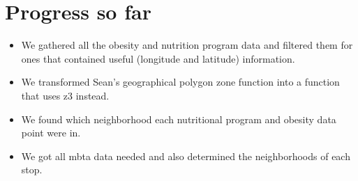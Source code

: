 \documentclass[12pt]{article}
\begin{document}
\section{Progress so far}
\begin{itemize}
\item We gathered all the obesity and nutrition program data and filtered them for ones that contained useful (longitude and latitude) information.
\item We transformed Sean's geographical polygon zone function into a function that uses z3 instead.
\item We found which neighborhood each nutritional program and obesity data point were in.
\item We got all mbta data needed and also determined the neighborhoods of each stop.
\end{itemize}
\end{document}
